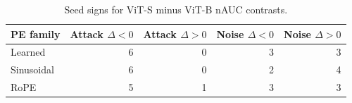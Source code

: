 \begin{table}[H]
\centering
\caption{Seed signs for ViT-S minus ViT-B nAUC contrasts.}
\label{tab:s-signs}
\begin{tabular}{lrrrr}
\toprule
PE family & Attack $\Delta<0$ & Attack $\Delta>0$ & Noise $\Delta<0$ & Noise $\Delta>0$ \\
\midrule
Learned & 6 & 0 & 3 & 3 \\
Sinusoidal & 6 & 0 & 2 & 4 \\
RoPE & 5 & 1 & 3 & 3 \\
\bottomrule
\end{tabular}
\end{table}

